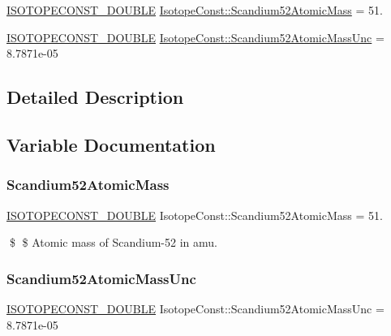 \begin{DoxyCompactItemize}
\item 
\mbox{\hyperlink{group___isotope_const-_macros_ga8f45a7272ce02c0b4c65c44636ed719a}{I\+S\+O\+T\+O\+P\+E\+C\+O\+N\+S\+T\+\_\+\+D\+O\+U\+B\+LE}} \mbox{\hyperlink{group___isotope_const-_scandium-_sc52_ga9099820987f4e31130a56d16a7a1a30a}{Isotope\+Const\+::\+Scandium52\+Atomic\+Mass}} = 51.
\item 
\mbox{\hyperlink{group___isotope_const-_macros_ga8f45a7272ce02c0b4c65c44636ed719a}{I\+S\+O\+T\+O\+P\+E\+C\+O\+N\+S\+T\+\_\+\+D\+O\+U\+B\+LE}} \mbox{\hyperlink{group___isotope_const-_scandium-_sc52_gaa403886aba397b52f48b8cc5df0736ba}{Isotope\+Const\+::\+Scandium52\+Atomic\+Mass\+Unc}} = 8.\+7871e-\/05
\end{DoxyCompactItemize}


\subsection{Detailed Description}


\subsection{Variable Documentation}
\mbox{\label{group___isotope_const-_scandium-_sc52_ga9099820987f4e31130a56d16a7a1a30a}} 
\subsubsection{\texorpdfstring{Scandium52\+Atomic\+Mass}{Scandium52AtomicMass}}
{\footnotesize\ttfamily \mbox{\hyperlink{group___isotope_const-_macros_ga8f45a7272ce02c0b4c65c44636ed719a}{I\+S\+O\+T\+O\+P\+E\+C\+O\+N\+S\+T\+\_\+\+D\+O\+U\+B\+LE}} Isotope\+Const\+::\+Scandium52\+Atomic\+Mass = 51.}

\$ \$ Atomic mass of Scandium-\/52 in amu. \mbox{\label{group___isotope_const-_scandium-_sc52_gaa403886aba397b52f48b8cc5df0736ba}} 
\subsubsection{\texorpdfstring{Scandium52\+Atomic\+Mass\+Unc}{Scandium52AtomicMassUnc}}
{\footnotesize\ttfamily \mbox{\hyperlink{group___isotope_const-_macros_ga8f45a7272ce02c0b4c65c44636ed719a}{I\+S\+O\+T\+O\+P\+E\+C\+O\+N\+S\+T\+\_\+\+D\+O\+U\+B\+LE}} Isotope\+Const\+::\+Scandium52\+Atomic\+Mass\+Unc = 8.\+7871e-\/05}

